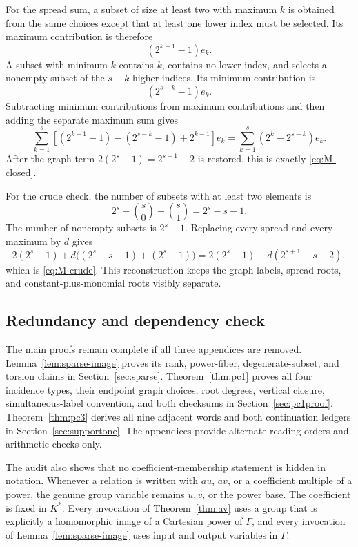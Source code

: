 \documentclass[11pt]{article}
\theoremstyle{definition}
\begin{document}
For the spread sum, a subset of size at least two with maximum \(k\) is obtained from the same choices except that at least one lower index must be selected. Its maximum contribution is therefore
\[
 (2^{k-1}-1)e_k.
\]
A subset with minimum \(k\) contains \(k\), contains no lower index, and selects a nonempty subset of the \(s-k\) higher indices. Its minimum contribution is
\[
 (2^{s-k}-1)e_k.
\]
Subtracting minimum contributions from maximum contributions and then adding the separate maximum sum gives
\[
 \sum_{k=1}^{s}
 \left[(2^{k-1}-1)-(2^{s-k}-1)+2^{k-1}\right]e_k
 =
 \sum_{k=1}^{s}(2^k-2^{s-k})e_k.
\]
After the graph term \(2(2^s-1)=2^{s+1}-2\) is restored, this is exactly \eqref{eq:M-closed}.

For the crude check, the number of subsets with at least two elements is
\[
 2^s-\binom s0-\binom s1=2^s-s-1.
\]
The number of nonempty subsets is \(2^s-1\). Replacing every spread and every maximum by \(d\) gives
\[
 2(2^s-1)+d\bigl((2^s-s-1)+(2^s-1)\bigr)
 =
 2(2^s-1)+d(2^{s+1}-s-2),
\]
which is \eqref{eq:M-crude}. This reconstruction keeps the graph labels, spread roots, and constant-plus-monomial roots visibly separate.


\subsection*{Redundancy and dependency check}

The main proofs remain complete if all three appendices are removed. Lemma~\ref{lem:sparse-image} proves its rank, power-fiber, degenerate-subset, and torsion claims in Section~\ref{sec:sparse}. Theorem~\ref{thm:pc1} proves all four incidence types, their endpoint graph choices, root degrees, vertical closure, simultaneous-label convention, and both checksums in Section~\ref{sec:pc1proof}. Theorem~\ref{thm:pc3} derives all nine adjacent words and both continuation ledgers in Section~\ref{sec:supportone}. The appendices provide alternate reading orders and arithmetic checks only.

The audit also shows that no coefficient-membership statement is hidden in notation. Whenever a relation is written with \(au\), \(av\), or a coefficient multiple of a power, the genuine group variable remains \(u,v\), or the power base. The coefficient is fixed in \(K^*\). Every invocation of Theorem~\ref{thm:av} uses a group that is explicitly a homomorphic image of a Cartesian power of \(\Gamma\), and every invocation of Lemma~\ref{lem:sparse-image} uses input and output variables in \(\Gamma\).
\end{document}
